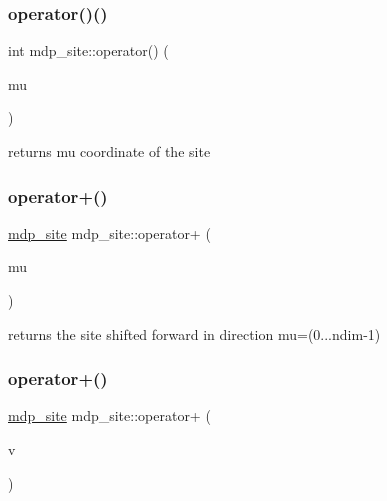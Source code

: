 \mbox{\label{classmdp__site_abbbb7f94657ed5112919578d63a3272c}} 
\subsubsection{\texorpdfstring{operator()()}{operator()()}}
{\footnotesize\ttfamily int mdp\+\_\+site\+::operator() (\begin{DoxyParamCaption}\item[{int}]{mu }\end{DoxyParamCaption})\hspace{0.3cm}{\ttfamily [inline]}}



returns mu coordinate of the site 

\mbox{\label{classmdp__site_a86993407e982dc5dbc92cca7dfdaa536}} 
\subsubsection{\texorpdfstring{operator+()}{operator+()}\hspace{0.1cm}{\footnotesize\ttfamily [1/2]}}
{\footnotesize\ttfamily \hyperlink{classmdp__site}{mdp\+\_\+site} mdp\+\_\+site\+::operator+ (\begin{DoxyParamCaption}\item[{int}]{mu }\end{DoxyParamCaption})\hspace{0.3cm}{\ttfamily [inline]}}



returns the site shifted forward in direction mu=(0...ndim-\/1) 

\mbox{\label{classmdp__site_a5fc9e1550603644416108c92cbf3cab8}} 
\subsubsection{\texorpdfstring{operator+()}{operator+()}\hspace{0.1cm}{\footnotesize\ttfamily [2/2]}}
{\footnotesize\ttfamily \hyperlink{classmdp__site}{mdp\+\_\+site} mdp\+\_\+site\+::operator+ (\begin{DoxyParamCaption}\item[{\hyperlink{classmdp__vector}{mdp\+\_\+vector}}]{v }\end{DoxyParamCaption})\hspace{0.3cm}{\ttfamily [inline]}}

